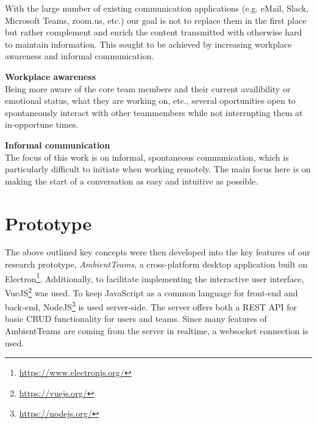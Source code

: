 \noindent With the large number of existing communication applications (e.g. eMail, Slack, Microsoft Teams, zoom.us, etc.) our goal is not to replace them in the first place but rather complement and enrich the content transmitted with otherwise hard to maintain information. This sought to be achieved by increasing workplace awareness and informal communication.

\medskip\noindent\textbf{Workplace awareness} \\
Being more aware of the core team members and their current availibility or emotional status, what they are working on, etc., several oportunities open to spontaneously interact with other teammembers while not interrupting them at in-opportune times.

\medskip\noindent\textbf{Informal communication} \\
The focus of this work is on informal, spontaneous communication, which is particularly difficult to initiate when working remotely. The main focus here is on making the start of a conversation as easy and intuitive as possible.

\section{Prototype}
The above outlined key concepts were then developed into the key features of our research prototype, \textit{AmbientTeams}, a cross-platform desktop application built on Electron\footnote{\url{https://www.electronjs.org/}}. Additionally, to facilitate implementing the interactive user interface, VueJS\footnote{\url{https://vuejs.org/}} was used. To keep JavaScript as a common language for front-end and back-end, NodeJS\footnote{\url{https://nodejs.org/}} is used server-side. The server offers both a REST API for basic CRUD functionality for users and teams. Since many features of AmbientTeams are coming from the server in realtime, a websocket connection is used.

